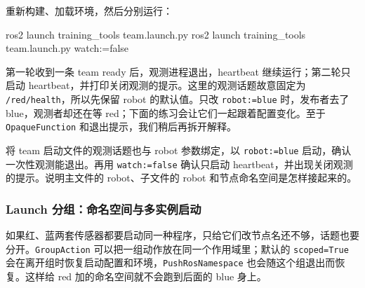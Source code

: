 \begin{example}[按条件观测一条消息]
重新构建、加载环境，然后分别运行：
\par\medskip\noindent\begin{minipage}{\linewidth}
\begin{tbash}
ros2 launch training_tools team.launch.py
ros2 launch training_tools team.launch.py watch:=false
\end{tbash}
\end{minipage}\par\smallskip
第一轮收到一条 team ready 后，观测进程退出，heartbeat 继续运行；第二轮只启动 heartbeat，并打印关闭观测的提示。这里的观测话题故意固定为 \texttt{/red/health}，所以先保留 robot 的默认值。只改 \texttt{robot:=blue} 时，发布者去了 blue，观测者却还在等 red；下面的练习会让它们一起跟着配置变化。至于 \texttt{OpaqueFunction} 和退出提示，我们稍后再拆开解释。
\end{example}

\begin{exercise}
\label{ex:v2-ros-launch}
将 team 启动文件的观测话题也与 robot 参数绑定，以 \texttt{robot:=blue} 启动，确认一次性观测能退出。再用 \texttt{watch:=false} 确认只启动 heartbeat，并出现关闭观测的提示。说明主文件的 robot、子文件的 robot 和节点命名空间是怎样接起来的。
\end{exercise}

\subsubsection{Launch 分组：命名空间与多实例启动}
如果红、蓝两套传感器都要启动同一种程序，只给它们改节点名还不够，话题也要分开。\nolinkurl{GroupAction} 可以把一组动作放在同一个作用域里；默认的 \texttt{scoped=True} 会在离开组时恢复启动配置和环境，\texttt{PushRosNamespace} 也会随这个组退出而恢复。这样给 red 加的命名空间就不会跑到后面的 blue 身上。

